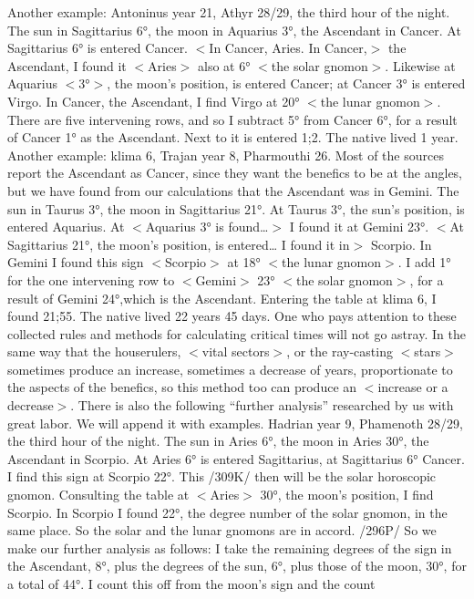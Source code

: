 Another example: Antoninus year 21, Athyr 28/29, the third hour of the night. The sun in Sagittarius
6°, the moon in Aquarius 3°, the Ascendant in Cancer. At Sagittarius 6° is entered Cancer. $<$In Cancer,
Aries. In Cancer,$>$ the Ascendant, I found it $<$Aries$>$ also at 6° $<$the solar gnomon$>$. Likewise at
Aquarius $<$3°$>$, the moon’s position, is entered Cancer; at Cancer 3° is entered Virgo. In Cancer, the
Ascendant, I find Virgo at 20° $<$the lunar gnomon$>$. There are five intervening rows, and so I subtract 5°
from Cancer 6°, for a result of Cancer 1° as the Ascendant. Next to it is entered 1;2. The native lived 1
year.
Another example: klima 6, Trajan year 8, Pharmouthi 26. Most of the sources report the Ascendant as
Cancer, since they want the benefics to be at the angles, but we have found from our calculations that the Ascendant was in Gemini. The sun in Taurus 3°, the moon in Sagittarius 21°. At Taurus 3°, the sun’s
position, is entered Aquarius. At $<$Aquarius 3° is found…$>$ I found it at Gemini 23°. $<$At Sagittarius 21°,
the moon’s position, is entered… I found it in$>$ Scorpio. In Gemini I found this sign $<$Scorpio$>$ at 18°
$<$the lunar gnomon$>$. I add 1° for the one intervening row to $<$Gemini$>$ 23° $<$the solar gnomon$>$, for a
result of Gemini 24°,which is the Ascendant. Entering the table at klima 6, I found 21;55. The native
lived 22 years 45 days.
One who pays attention to these collected rules and methods for calculating critical times will not go
astray. In the same way that the houserulers, $<$vital sectors$>$, or the ray-casting $<$stars$>$ sometimes produce
an increase, sometimes a decrease of years, proportionate to the aspects of the benefics, so this method too
can produce an $<$increase or a decrease$>$.
There is also the following “further analysis” researched by us with great labor. We will append it
with examples.
Hadrian year 9, Phamenoth 28/29, the third hour of the night. The sun in Aries 6°, the moon in Aries
30°, the Ascendant in Scorpio. At Aries 6° is entered Sagittarius, at Sagittarius 6° Cancer. I find this sign
at Scorpio 22°. This /309K/ then will be the solar horoscopic gnomon. Consulting the table at $<$Aries$>$
30°, the moon’s position, I find Scorpio. In Scorpio I found 22°, the degree number of the solar gnomon,
in the same place. So the solar and the lunar gnomons are in accord. /296P/ So we make our further
analysis as follows: I take the remaining degrees of the sign in the Ascendant, 8°, plus the degrees of the
sun, 6°, plus those of the moon, 30°, for a total of 44°. I count this off from the moon’s sign and the count
